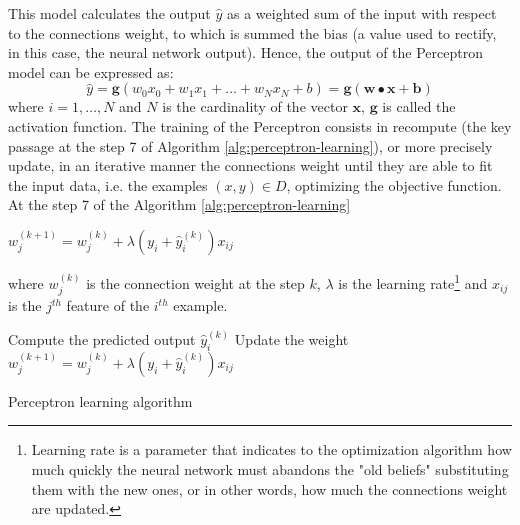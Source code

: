 This model calculates the output $\hat{y}$ as a weighted sum of the input with respect to the connections weight, to which is summed the bias (a value used to rectify, in this case, the neural network output). Hence, the output of the Perceptron model can be expressed as:
\begin{equation}
	\hat{y} = \textbf{g}(w_{0}x_{0} + w_{1}x_{1} + \dots + w_{N}x_{N} + b  ) = \textbf{g}(\textbf{w} \bullet \textbf{x} + \textbf{b})
\end{equation}
where $i = 1, \dots, N$ and $N$ is the cardinality of the vector $\textbf{x}$,  $\textbf{g}$ is called the activation function.
The training of the Perceptron consists in recompute (the key passage at the step 7 of Algorithm \ref{alg:perceptron-learning}), or more precisely update, in an iterative manner the connections weight until they are able to fit the input data, i.e. the examples $(x, y) \in D$, optimizing the objective function.
At the step 7 of the Algorithm \ref{alg:perceptron-learning}
\begin{center}
	$w_{j}^{(k + 1)} = w_{j}^{(k)} + \lambda(y_{i} + \hat{y}_{i}^{(k)})x_{ij}$	
\end{center}
where $w_{j}^{(k)}$ is the connection weight at the step $k$, $\lambda$ is the learning rate\footnote{Learning rate is a parameter that indicates to the optimization algorithm how much quickly the neural network must abandons the "old beliefs" substituting them with the new ones, or in other words, how much the connections weight are updated.} and $x_{ij}$ is the $j^{th}$ feature of the $i^{th}$ example.

\begin{algorithm}[t]
	\begin{algorithmic}[1]
		\Repeat
				\State Compute the predicted output $\hat{y}_{i}^{(k)}$
					\State Update the weight $w_{j}^{(k + 1)} = w_{j}^{(k)} + \lambda(y_{i} + \hat{y}_{i}^{(k)})x_{ij}$
				\EndFor
			\EndFor
	\end{algorithmic}
	\caption{Perceptron learning algorithm \cite{ITDM:2014}}\label{alg:perceptron-learning}
\end{algorithm}

